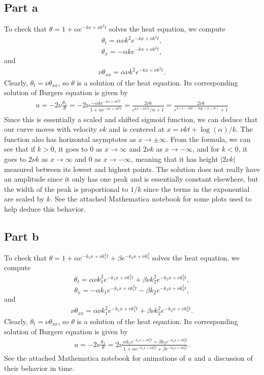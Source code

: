 \documentclass{article}
\begin{document}
\subsection{Part a}
To check that $\theta = 1 + \alpha e^{-kx+\nu k^2 t}$ solves the heat equation, we compute
\begin{align*}
\theta_t=\alpha\nu k^2e^{-kx+\nu k^2 t},
\end{align*}
\[
\theta_x=-\alpha ke^{-kx+\nu k^2 t},
\]
and
\begin{align*}
\nu\theta_{xx}=\alpha\nu k^2e^{-kx+\nu k^2 t}.
\end{align*}
Clearly, $\theta_t=\nu\theta_{xx}$, so $\theta$ is a solution of the heat equation. Its corresponding solution of Burgers equation is given by
\begin{align*}
u=-2\nu\frac{\theta_x}{\theta}=-2\nu\frac{-\alpha ke^{-kx+\nu k^2 t}}{1 + \alpha e^{-kx+\nu k^2 t}}=\frac{2\nu k}{ e^{kx-\nu k^2 t}/\alpha+1}=\frac{2\nu k}{e^{k(x-\nu k t-\log(\alpha)/k)}+1}
\end{align*}
Since this is essentially a scaled and shifted sigmoid function, we can deduce that our curve moves with velocity $\nu k$ and is centered at $x=\nu kt+\log(\alpha)/k$. The function also has horizontal asymptotes as $x\to\pm\infty$. From the formula, we can see that if $k>0$, it goes to $0$ as $x\to\infty$ and $2\nu k$ as $x\to-\infty$, and for $k<0$, it goes to $2\nu k$ as $x\to\infty$ and $0$ as $x\to-\infty$, meaning that it has height $|2\nu k|$ measured between its lowest and highest points. The solution does not really have an amplitude since it only has one peak and is essentially constant elsewhere, but the width of the peak is proportional to $1/k$ since the terms in the exponential are scaled by $k$. See the attached Mathematica notebook for some plots used to help deduce this behavior. 

\subsection{Part b}
To check that $\theta = 1 + \alpha e^{-k_1x+\nu k_1^2 t}+ \beta e^{-k_2x + \nu k_2^2}$ solves the heat equation, we compute
\begin{align*}
	\theta_t=\alpha\nu k_1^2e^{-k_1x+\nu k_1^2 t}+\beta\nu k_2^2e^{-k_2x+\nu k_2^2 t},
\end{align*}
\[
\theta_x=-\alpha k_1e^{-k_1x+\nu k_1^2 t}-\beta k_2e^{-k_2x+\nu k_2^2 t},
\]
and
\begin{align*}
	\nu\theta_{xx}=\alpha\nu k_1^2e^{-k_1x+\nu k_1^2 t}+\beta\nu k_2^2e^{-k_2x+\nu k_2^2 t}.
\end{align*}
Clearly, $\theta_t=\nu\theta_{xx}$, so $\theta$ is a solution of the heat equation. Its corresponding solution of Burgers equation is given by
\begin{align*}
	u=-2\nu\frac{\theta_x}{\theta}=2\nu\frac{\alpha k_1e^{-k_1x+\nu k_1^2 t}+\beta k_2e^{-k_2x+\nu k_2^2 t}}{1 + \alpha e^{-k_1x+\nu k_1^2 t}+ \beta e^{-k_2x + \nu k_2^2t}}.
\end{align*}
See the attached Mathematica notebook for animations of $u$ and a discussion of their behavior in time.
\end{document}
